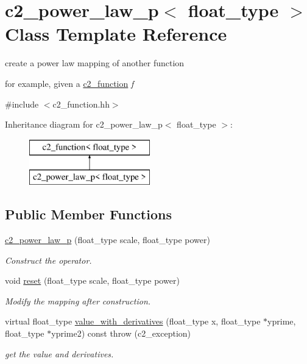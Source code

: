 \hypertarget{classc2__power__law__p}{\section{c2\-\_\-power\-\_\-law\-\_\-p$<$ float\-\_\-type $>$ Class Template Reference}
\label{classc2__power__law__p}
}


create a power law mapping of another function

for example, given a \hyperlink{classc2__function}{c2\-\_\-function} {\itshape f}  




{\ttfamily \#include $<$c2\-\_\-function.\-hh$>$}

Inheritance diagram for c2\-\_\-power\-\_\-law\-\_\-p$<$ float\-\_\-type $>$\-:\begin{figure}[H]
\begin{center}
\leavevmode
\includegraphics[height=2.000000cm]{classc2__power__law__p}
\end{center}
\end{figure}
\subsection*{Public Member Functions}
\begin{DoxyCompactItemize}
\item 
\hyperlink{classc2__power__law__p_aa94656e3e7b7fd9a78da1ff188258cc1}{c2\-\_\-power\-\_\-law\-\_\-p} (float\-\_\-type scale, float\-\_\-type power)
\begin{DoxyCompactList}\small\item\em Construct the operator. \end{DoxyCompactList}\item 
void \hyperlink{classc2__power__law__p_a2ac1227acd7b9bf34afd26efadc47ccb}{reset} (float\-\_\-type scale, float\-\_\-type power)
\begin{DoxyCompactList}\small\item\em Modify the mapping after construction. \end{DoxyCompactList}\item 
virtual float\-\_\-type \hyperlink{classc2__power__law__p_a21f0088450f7b7110a001f4960e95fa1}{value\-\_\-with\-\_\-derivatives} (float\-\_\-type x, float\-\_\-type $\ast$yprime, float\-\_\-type $\ast$yprime2) const   throw (c2\-\_\-exception)
\begin{DoxyCompactList}\small\item\em get the value and derivatives. \end{DoxyCompactList}\end{DoxyCompactItemize}
